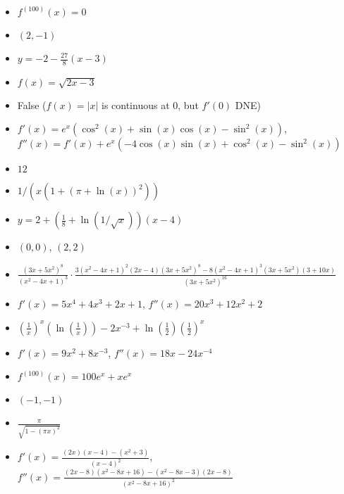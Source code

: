 \documentclass{article}
\begin{document}
\begin{itemize}
\item $f^{(100)}(x)=0$
\item $(2,-1)$
\item $y=-2-\frac{27}{8}(x-3)$
\item $f(x)=\sqrt{2x-3}$
\item False ($f(x)=|x|$ is continuous at $0$, but $f'(0)$ DNE)
\item $f'(x)=e^{x}(\cos^{2}(x)+\sin(x)\cos(x)-\sin^{2}(x))$, \\$f''(x)=f'(x)+e^{x}\left(-4\cos\left(x\right)\sin\left(x\right)+\cos^{2}\left(x\right)-\sin^{2}\left(x\right)\right)$
\item $12$
\item $1 / (x(1+(\pi+\ln(x))^2))$
\item $y=2+\left(\frac18+\ln(1/\sqrt{x})\right)(x-4)$
\item $(0,0)$, $(2,2)$
\item $\frac{(3x+5x^2)^8}{(x^2-4x+1)^3}\cdot\frac{3(x^2-4x+1)^2(2x-4)(3x+5x^2)^8-8(x^2-4x+1)^3(3x+5x^2)(3+10x)}{(3x+5x^2)^{16}}$
\item $f'(x)=5x^4+4x^3+2x+1$, $f''(x)=20x^3+12x^2+2$
\item $\left(\frac{1}{x}\right)^x\left(\ln\left(\frac{1}{x}\right)\right)-2x^{-3}+\ln\left(\frac12\right)\left(\frac12\right)^x$
\item $f'(x)=9x^2+8x^{-3}$, $f''(x)=18x-24x^{-4}$
\item $f^{(100)}(x)=100e^x+xe^x$
\item $(-1,-1)$
\item $\frac{\pi}{\sqrt{1-(\pi x)^2}}$
\item $f'(x)=\frac{(2x)(x-4)-(x^2+3)}{(x-4)^2}$, $f''(x)=\frac{(2x-8)(x^2-8x+16)-(x^2-8x-3)(2x-8)}{(x^2-8x+16)^2}$
\end{itemize}
\end{document}
